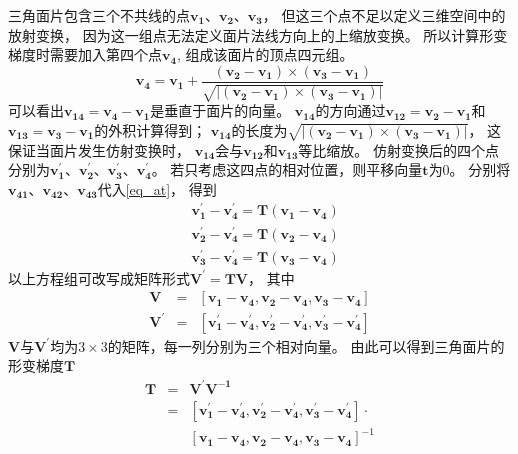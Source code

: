 三角面片包含三个不共线的点$\bm{v_1}$、$\bm{v_2}$、$\bm{v_3}$，
但这三个点不足以定义三维空间中的放射变换，
因为这一组点无法定义面片法线方向上的上缩放变换。
所以计算形变梯度时需要加入第四个点$\bm{v_4}$,
组成该面片的顶点四元组。
\begin{equation}
    \bm{v_4}=\bm{v_1}
    +
    \frac
        {(\bm{v_2}-\bm{v_1})\times(\bm{v_3}-\bm{v_1})}
        {\sqrt{|(\bm{v_2}-\bm{v_1})\times(\bm{v_3}-\bm{v_1})|}}
\end{equation}
可以看出$\bm{v_{14}}=\bm{v_4}-\bm{v_1}$是垂直于面片的向量。
$\bm{v_{14}}$的方向通过$\bm{v_{12}}=\bm{v_2}-\bm{v_1}$和
$\bm{v_{13}}=\bm{v_3}-\bm{v_1}$的外积计算得到；
$\bm{v_{14}}$的长度为$\sqrt{|(\bm{v_2}-\bm{v_1})\times(\bm{v_3}-\bm{v_1})|}$，
这保证当面片发生仿射变换时，
$\bm{v_{14}}$会与$\bm{v_{12}}$和$\bm{v_{13}}$等比缩放。
仿射变换后的四个点分别为$\bm{v_1^{'}}$、$\bm{v_2^{'}}$、$\bm{v_3^{'}}$、$\bm{v_4^{'}}$。
若只考虑这四点的相对位置，则平移向量$\bm{t}$为0。
分别将$\bm{v_{41}}$、$\bm{v_{42}}$、$\bm{v_{43}}$代入\ref{eq_at}，
得到
\begin{equation}
    \begin{aligned}
        &\bm{v_1^{'}}-\bm{v_4^{'}}=\bm{T}(\bm{v_1}-\bm{v_4})\\
        &\bm{v_2^{'}}-\bm{v_4^{'}}=\bm{T}(\bm{v_2}-\bm{v_4})\\
        &\bm{v_3^{'}}-\bm{v_4^{'}}=\bm{T}(\bm{v_3}-\bm{v_4})
    \end{aligned}
\end{equation}
以上方程组可改写成矩阵形式$\bm{V^{'}}=\bm{T}\bm{V}$，
其中
\begin{eqnarray}
     \bm{V}    &=&[\bm{v_1}-\bm{v_4},\bm{v_2}-\bm{v_4},\bm{v_3}-\bm{v_4}] \nonumber \\
     \bm{V^{'}}&=&[\bm{v_1^{'}}-\bm{v_4^{'}},\bm{v_2^{'}}-\bm{v_4^{'}},\bm{v_3^{'}}-\bm{v_4^{'}}]
\end{eqnarray}
$\bm{V}$与$\bm{V^{'}}$均为$3 \times 3$的矩阵，每一列分别为三个相对向量。
由此可以得到三角面片的形变梯度$\bm{T}$
\begin{eqnarray}
    \label{eq_def_grad}
    \bm{T}
    &= &\bm{V^{'}}\bm{V^{-1}} \nonumber \\
    &= &[\bm{v_1^{'}}-\bm{v_4^{'}},\bm{v_2^{'}}-\bm{v_4^{'}},\bm{v_3^{'}}-\bm{v_4^{'}}]\cdot \nonumber \\
    &\ &[\bm{v_1}-\bm{v_4},\bm{v_2}-\bm{v_4},\bm{v_3}-\bm{v_4}]^{-1}
\end{eqnarray}

